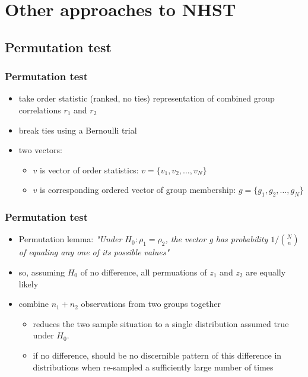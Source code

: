 \documentclass{beamer}
\begin{document}
  \section{Other approaches to NHST}
  \subsection{Permutation test}
  \begin{frame}
    \frametitle{Permutation test }  
    \begin{itemize}
		  \item take order statistic (ranked, no ties) representation of combined group correlations \(r_1\) and \(r_2\) 
	  	\item break ties using a Bernoulli trial
	  	\item two vectors:
      \begin{itemize}
				\item \(v\) is vector of order statistics: \(v = \{v_1, v_2,\ldots, v_N\}\)
			  \item \(v\) is corresponding ordered vector of group membership: \(g = \{g_1, g_2,\ldots, g_N\}\)
      \end{itemize}
    \end{itemize}
  \end{frame} 
  
  \begin{frame}
    \frametitle{Permutation test }  
    \begin{itemize}
	  	\item Permutation lemma: \it{"Under \(H_0: \rho_1 = \rho_2\), the vector g has probability \(1/\binom{N}{n}\) of equaling any one of its possible values"}
      \item so, assuming \(H_0\) of no difference, all permuations of \(z_1\) and \(z_2\) are equally likely
  		\item combine \(n_1 + n_2\) observations from two groups together
      \begin{itemize}
        \item reduces the two sample situation to a single distribution assumed true under \(H_0\).
	    	\item if no difference, should be no discernible pattern of this difference in distributions when re-sampled a sufficiently large number of times
      \end{itemize}
    \end{itemize}
  \end{frame} 
      
\end{document}
